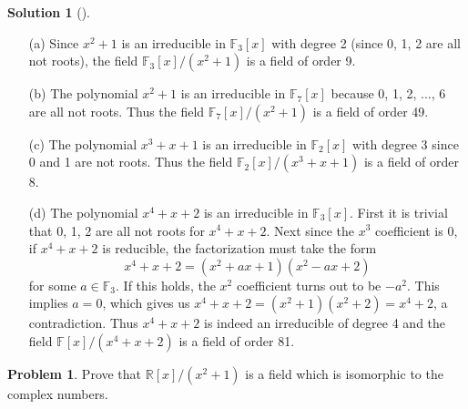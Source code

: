 \documentclass{article}
\theoremstyle{definition}
\newtheorem{prob}{Problem}
\newtheorem*{sol}{Solution}
\newenvironment{sols}[1][]{%
  \begin{sol}[#1]$ $\par\nobreak\ignorespaces
}{%
  \end{sol}
}
\begin{document}
\begin{sols}
	\begin{enumerate}
		\item[(a)] Since $x^2 + 1$ is an irreducible in $\mathbb{F}_3[x]$ with degree 2 (since 0, 1, 2 are all not roots), the field $\mathbb{F}_3[x]/(x^2 + 1)$ is a field of order 9.

		\item[(b)] The polynomial $x^2 + 1$ is an irreducible in $\mathbb{F}_7[x]$ because 0, 1, 2, ..., 6 are all not roots. 
			Thus the field $\mathbb{F}_7[x]/(x^2 + 1)$ is a field of order 49.

		\item[(c)] The polynomial $x^3 + x + 1$ is an irreducible in $\mathbb{F}_2[x]$ with degree 3 since 0 and 1 are not roots. Thus the field $\mathbb{F}_2[x]/(x^3 + x + 1)$ is a field of order 8.  
			
		\item[(d)] The polynomial $x^4 + x + 2$ is an irreducible in $\mathbb{F}_3[x]$. 
			First it is trivial that 0, 1, 2 are all not roots for $x^4 + x + 2$. 
			Next since the $x^3$ coefficient is 0, if $x^4 + x + 2$ is reducible, the factorization must take the form
			\[
				x^4 + x + 2 = (x^2 + ax + 1)(x^2 - ax + 2)
			\]
			for some $a \in \mathbb{F}_3$. 
			If this holds, the $x^2$ coefficient turns out to be $-a^2$. 
			This implies $a = 0$, which gives us $x^4 + x + 2 = (x^2 + 1)(x^2 + 2) = x^4 + 2$, a contradiction.
			Thus $x^4 + x + 2$ is indeed an irreducible of degree 4 and the field $\mathbb{F}[x]/(x^4 + x + 2)$ is a field of order 81.
			
	\end{enumerate}
\end{sols}

\setcounter{prob}{6}
\begin{prob}
	Prove that $\mathbb{R}[x]/(x^2 + 1)$ is a field which is isomorphic to the complex numbers.	
\end{prob}
\end{document}
